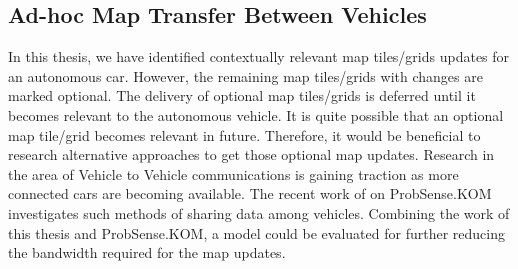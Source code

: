 \subsection{Ad-hoc Map Transfer Between Vehicles}
In this thesis, we have identified contextually relevant map tiles/grids updates for an autonomous car. However, the remaining map tiles/grids with changes are marked optional. The delivery of optional map tiles/grids is deferred until it becomes relevant to the autonomous vehicle. It is quite possible that an optional map tile/grid becomes relevant in future. Therefore, it would be beneficial to research alternative approaches to get those optional map updates. Research in the area of Vehicle to Vehicle communications is gaining traction as more connected cars are becoming available. The recent work of \citet{probsense} on ProbSense.KOM investigates such methods of sharing data among vehicles. Combining the work of this thesis and ProbSense.KOM, a model could be evaluated for further reducing the bandwidth required for the map updates.





